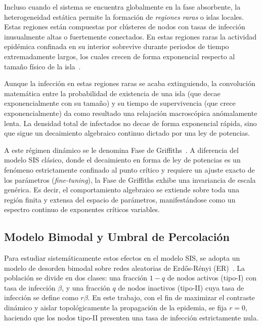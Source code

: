 \documentclass[%
reprint,
amsmath,amssymb,
aps,
]{revtex4-2}
\begin{document}
	Incluso cuando el sistema se encuentra globalmente en la fase absorbente, la heterogeneidad estática permite la formación de \textit{regiones raras} o islas locales. Estas regiones están compuestas por clústeres de nodos con tasas de infección inusualmente altas o fuertemente conectados. En estas regiones raras la actividad epidémica confinada en su interior sobrevive durante periodos de tiempo extremadamente largos, los cuales crecen de forma exponencial respecto al tamaño físico de la isla~\cite{Muñoz2010}.
	
	Aunque la infección en estas regiones raras se acaba extinguiendo, la convolución matemática entre la probabilidad de existencia de una isla (que decae exponencialmente con su tamaño) y su tiempo de supervivencia (que crece exponencialmente) da como resultado una relajación macroscópica anómalamente lenta. La densidad total de infectados no decae de forma exponencial rápida, sino que sigue un decaimiento algebraico continuo dictado por una ley de potencias.
	
	A este régimen dinámico se le denomina Fase de Griffiths~\cite{Noest1986,Muñoz2010,Bray1987}. A diferencia del modelo SIS clásico, donde el decaimiento en forma de ley de potencias es un fenómeno estrictamente confinado al punto crítico y requiere un ajuste exacto de los parámetros (\textit{fine-tuning}), la Fase de Griffiths exhibe una invariancia de escala genérica. Es decir, el comportamiento algebraico se extiende sobre toda una región finita y extensa del espacio de parámetros, manifestándose como un espectro continuo de exponentes críticos variables.
	
	\subsection{Modelo Bimodal y Umbral de Percolación}
	
	Para estudiar sistemáticamente estos efectos en el modelo SIS, se adopta un modelo de desorden bimodal sobre redes aleatorias de Erdős-Rényi (ER)~\cite{Muñoz2010}. La población se divide en dos clases: una fracción $1-q$ de nodos activos (tipo-I) con tasa de infección $\beta$, y una fracción $q$ de nodos inactivos (tipo-II) cuya tasa de infección se define como $r\beta$. En este trabajo, con el fin de maximizar el contraste dinámico y aislar topológicamente la propagación de la epidemia, se fija $r=0$, haciendo que los nodos tipo-II presenten una tasa de infección estrictamente nula.
	
\end{document}
